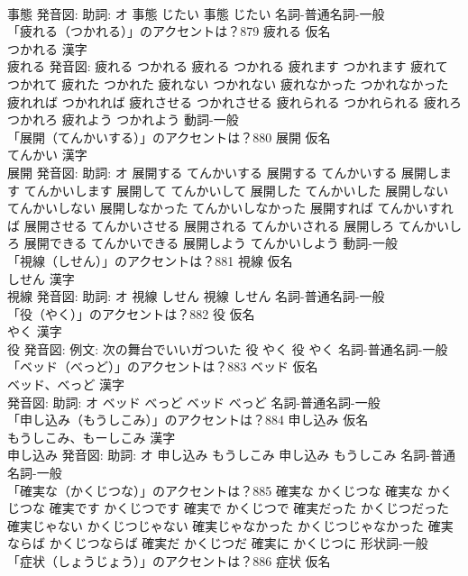 \documentclass[8pt]{extreport}
\begin{document}
\begin{CJK}{UTF8}{min}
\\	事態 発音図: 助詞: オ	事態 じたい		事態 じたい				名詞-普通名詞-一般 
\\	「疲れる（つかれる）」のアクセントは？879	疲れる 仮名　
\\	つかれる 漢字　
\\	疲れる 発音図:	疲れる つかれる		疲れる つかれる 疲れます つかれます 疲れて つかれて 疲れた つかれた 疲れない つかれない 疲れなかった つかれなかった 疲れれば つかれれば 疲れさせる つかれさせる 疲れられる つかれられる 疲れろ つかれろ 疲れよう つかれよう				動詞-一般 
\\	「展開（てんかいする）」のアクセントは？880	展開 仮名　
\\	てんかい 漢字　
\\	展開 発音図: 助詞: オ	展開する てんかいする		展開する てんかいする 展開します てんかいします 展開して てんかいして 展開した てんかいした 展開しない てんかいしない 展開しなかった てんかいしなかった 展開すれば てんかいすれば 展開させる てんかいさせる 展開される てんかいされる 展開しろ てんかいしろ 展開できる てんかいできる 展開しよう てんかいしよう				動詞-一般 
\\	「視線（しせん）」のアクセントは？881	視線 仮名　
\\	しせん 漢字　
\\	視線 発音図: 助詞: オ	視線 しせん		視線 しせん				名詞-普通名詞-一般 
\\	「役（やく）」のアクセントは？882	役 仮名　
\\	やく 漢字　
\\	役 発音図: 例文: 次の舞台でいいガついた	役 やく		役 やく				名詞-普通名詞-一般 
\\	「ベッド（べっど）」のアクセントは？883	ベッド 仮名　
\\	ベッド、べっど 漢字　
\\	発音図: 助詞: オ	ベッド べっど		ベッド べっど				名詞-普通名詞-一般 
\\	「申し込み（もうしこみ）」のアクセントは？884	申し込み 仮名　
\\	もうしこみ、もーしこみ 漢字　
\\	申し込み 発音図: 助詞: オ	申し込み もうしこみ		申し込み もうしこみ				名詞-普通名詞-一般 
\\	「確実な（かくじつな）」のアクセントは？885		確実な かくじつな		確実な かくじつな 確実です かくじつです 確実で かくじつで 確実だった かくじつだった 確実じゃない かくじつじゃない 確実じゃなかった かくじつじゃなかった 確実ならば かくじつならば 確実だ かくじつだ 確実に かくじつに				形状詞-一般 
\\	「症状（しょうじょう）」のアクセントは？886	症状 仮名　

\end{CJK}
\end{document}
